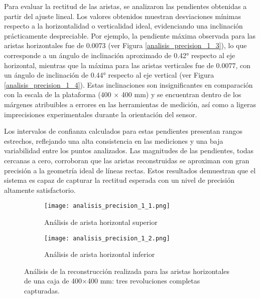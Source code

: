 Para evaluar la rectitud de las aristas, se analizaron las pendientes obtenidas a partir del ajuste lineal. Los valores obtenidos muestran desviaciones mínimas respecto a la horizontalidad o verticalidad ideal, evidenciando una inclinación prácticamente despreciable. Por ejemplo, la pendiente máxima observada para las aristas horizontales fue de 0.0073 (ver Figura \ref{analisis_precision_1_3}), lo que corresponde a un ángulo de inclinación aproximado de 0.42° respecto al eje horizontal, mientras que la máxima para las aristas verticales fue de 0.0077, con un ángulo de inclinación de 0.44° respecto al eje vertical (ver Figura \ref{analisis_precision_1_4}). Estas inclinaciones son insignificantes en comparación con la escala de la plataforma (400 $\times$ 400 mm) y se encuentran dentro de los márgenes atribuibles a errores en las herramientas de medición, así como a ligeras imprecisiones experimentales durante la orientación del sensor.

Los intervalos de confianza calculados para estas pendientes presentan rangos estrechos, reflejando una alta consistencia en las mediciones y una baja variabilidad entre los puntos analizados. Las magnitudes de las pendientes, todas cercanas a cero, corroboran que las aristas reconstruidas se aproximan con gran precisión a la geometría ideal de líneas rectas. Estos resultados demuestran que el sistema es capaz de capturar la rectitud esperada con un nivel de precisión altamente satisfactorio.

\begin{figure}[H]
	\centering
	\begin{subfigure}{\textwidth}
		\centering
		\texttt{[image: analisis\_precision\_1\_1.png]}
		\caption{Análisis de arista horizontal superior}
		\label{analisis_precision_1_1}
	\end{subfigure}
	\hspace{1em}
	\begin{subfigure}{\textwidth}
		\centering
		\texttt{[image: analisis\_precision\_1\_2.png]}
		\caption{Análisis de arista horizontal inferior}
		\label{analisis_precision_1_2}
	\end{subfigure}
	\caption{Análisis de la reconstrucción realizada para las aristas horizontales de una caja de 400$\times$400 mm: tres revoluciones completas capturadas.}
	\label{fig: reconstruccion_analisis_horizontal_1}
\end{figure}

